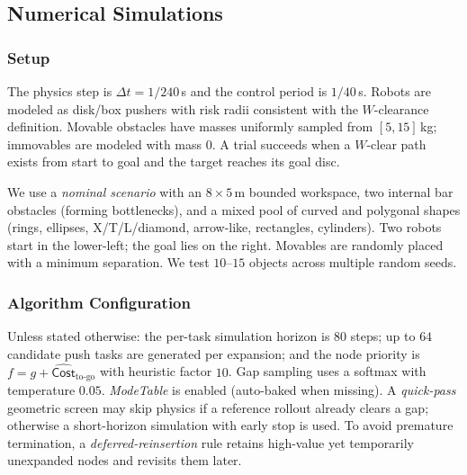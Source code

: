 \subsection{Numerical Simulations}
\label{subsec:sim}

\subsubsection{Setup}
\label{subsec:sim-setup}
The physics step is $\Delta t=1/240$\,s and the control period is $1/40$\,s. Robots are modeled as disk/box pushers with risk radii consistent with the $W$-clearance definition. Movable obstacles have masses uniformly sampled from $[5,15]$\,kg; immovables are modeled with mass $0$. A trial succeeds when a $W$-clear path exists from start to goal and the target reaches its goal disc.

We use a \emph{nominal scenario} with an $8{\times}5$\,m bounded workspace, two internal bar obstacles (forming bottlenecks), and a mixed pool of curved and polygonal shapes (rings, ellipses, X/T/L/diamond, arrow-like, rectangles, cylinders). Two robots start in the lower-left; the goal lies on the right. Movables are randomly placed with a minimum separation. We test $10\text{--}15$ objects across multiple random seeds.

\subsubsection{Algorithm Configuration}
\label{subsec:algo-config}
Unless stated otherwise: the per-task simulation horizon is $80$ steps; up to $64$ candidate push tasks are generated per expansion; and the node priority is $f=g+\widehat{\mathsf{Cost}}_{\text{to-go}}$ with heuristic factor $10$. Gap sampling uses a softmax with temperature $0.05$. \textit{ModeTable} is enabled (auto-baked when missing). A \emph{quick-pass} geometric screen may skip physics if a reference rollout already clears a gap; otherwise a short-horizon simulation with early stop is used. To avoid premature termination, a \emph{deferred-reinsertion} rule retains high-value yet temporarily unexpanded nodes and revisits them later.




